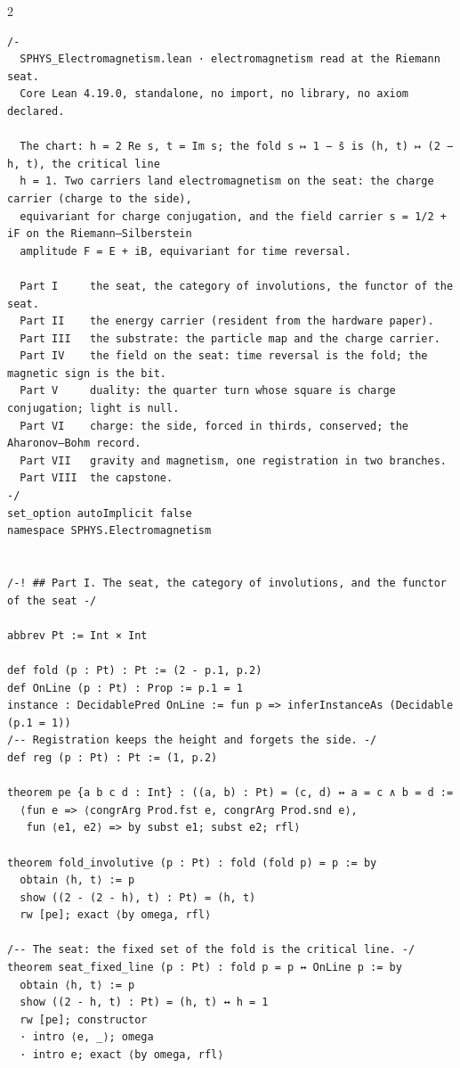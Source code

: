 \documentclass[10pt]{article}
\begin{document}
\begin{multicols}{2}
\begin{Verbatim}[fontsize=\fontsize{6.0}{6.9}\selectfont,breaklines,breakanywhere,breaksymbolleft={}]
/-
  SPHYS_Electromagnetism.lean · electromagnetism read at the Riemann seat.
  Core Lean 4.19.0, standalone, no import, no library, no axiom declared.

  The chart: h = 2 Re s, t = Im s; the fold s ↦ 1 − s̄ is (h, t) ↦ (2 − h, t), the critical line
  h = 1. Two carriers land electromagnetism on the seat: the charge carrier (charge to the side),
  equivariant for charge conjugation, and the field carrier s = 1/2 + iF on the Riemann–Silberstein
  amplitude F = E + iB, equivariant for time reversal.

  Part I     the seat, the category of involutions, the functor of the seat.
  Part II    the energy carrier (resident from the hardware paper).
  Part III   the substrate: the particle map and the charge carrier.
  Part IV    the field on the seat: time reversal is the fold; the magnetic sign is the bit.
  Part V     duality: the quarter turn whose square is charge conjugation; light is null.
  Part VI    charge: the side, forced in thirds, conserved; the Aharonov–Bohm record.
  Part VII   gravity and magnetism, one registration in two branches.
  Part VIII  the capstone.
-/
set_option autoImplicit false
namespace SPHYS.Electromagnetism


/-! ## Part I. The seat, the category of involutions, and the functor of the seat -/

abbrev Pt := Int × Int

def fold (p : Pt) : Pt := (2 - p.1, p.2)
def OnLine (p : Pt) : Prop := p.1 = 1
instance : DecidablePred OnLine := fun p => inferInstanceAs (Decidable (p.1 = 1))
/-- Registration keeps the height and forgets the side. -/
def reg (p : Pt) : Pt := (1, p.2)

theorem pe {a b c d : Int} : ((a, b) : Pt) = (c, d) ↔ a = c ∧ b = d :=
  ⟨fun e => ⟨congrArg Prod.fst e, congrArg Prod.snd e⟩,
   fun ⟨e1, e2⟩ => by subst e1; subst e2; rfl⟩

theorem fold_involutive (p : Pt) : fold (fold p) = p := by
  obtain ⟨h, t⟩ := p
  show ((2 - (2 - h), t) : Pt) = (h, t)
  rw [pe]; exact ⟨by omega, rfl⟩

/-- The seat: the fixed set of the fold is the critical line. -/
theorem seat_fixed_line (p : Pt) : fold p = p ↔ OnLine p := by
  obtain ⟨h, t⟩ := p
  show ((2 - h, t) : Pt) = (h, t) ↔ h = 1
  rw [pe]; constructor
  · intro ⟨e, _⟩; omega
  · intro e; exact ⟨by omega, rfl⟩


\end{Verbatim}
\end{multicols}
\end{document}
